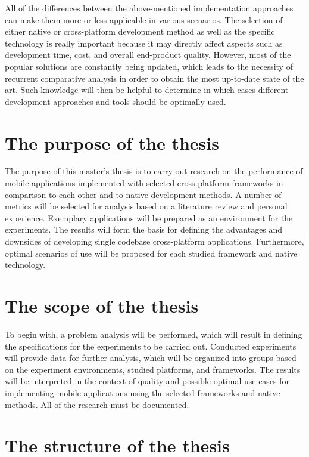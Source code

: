 All of the differences between the above-mentioned implementation approaches can make them more or less applicable in various scenarios. The selection of either native or cross-platform development method as well as the specific technology is really important because it may directly affect aspects such as development time, cost, and overall end-product quality. However, most of the popular solutions are constantly being updated, which leads to the necessity of recurrent comparative analysis in order to obtain the most up-to-date state of the art. Such knowledge will then be helpful to determine in which cases different development approaches and tools should be optimally used.

\section{The purpose of the thesis}

The purpose of this master's thesis is to carry out research on the performance of mobile applications implemented with selected cross-platform frameworks in comparison to each other and to native development methods. A number of metrics will be selected for analysis based on a literature review and personal experience. Exemplary applications will be prepared as an environment for the experiments. The results will form the basis for defining the advantages and downsides of developing single codebase cross-platform applications. Furthermore, optimal scenarios of use will be proposed for each studied framework and native technology.

\section{The scope of the thesis}

To begin with, a problem analysis will be performed, which will result in defining the specifications for the experiments to be carried out. Conducted experiments will provide data for further analysis, which will be organized into groups based on the experiment environments, studied platforms, and frameworks. The results will be interpreted in the context of quality and possible optimal use-cases for implementing mobile applications using the selected frameworks and native methods. All of the research must be documented.

\section{The structure of the thesis}

